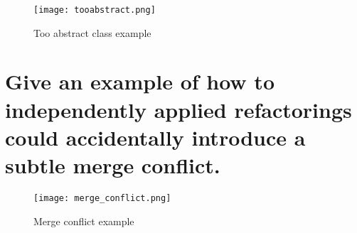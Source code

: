 \begin{figure}[!ht]
\centering
\texttt{[image: tooabstract.png]}
\caption{Too abstract class example}
\end{figure}
\FloatBarrier{}

\section{Give an example of how to independently applied refactorings could accidentally introduce a
subtle merge conflict.}

\begin{figure}[!ht]
\centering
\texttt{[image: merge\_conflict.png]}
\caption{Merge conflict example}
\end{figure}
\FloatBarrier{}
